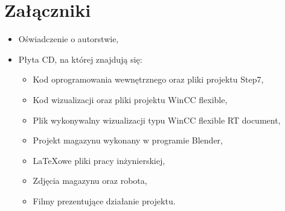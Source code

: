 \section{Załączniki}
\begin{itemize}
\item Oświadczenie o autorstwie,
\item Płyta CD, na której znajdują się:
\begin{itemize}
\item Kod oprogramowania wewnętrznego oraz pliki projektu Step7,
\item Kod wizualizacji oraz pliki projektu WinCC flexible,
\item Plik wykonywalny wizualizacji typu WinCC flexible RT document,
\item Projekt magazynu wykonany w programie Blender,
\item LaTeXowe pliki pracy inżynierskiej,
\item Zdjęcia magazynu oraz robota,
\item Filmy prezentujące działanie projektu.
\end{itemize}
\end{itemize}
